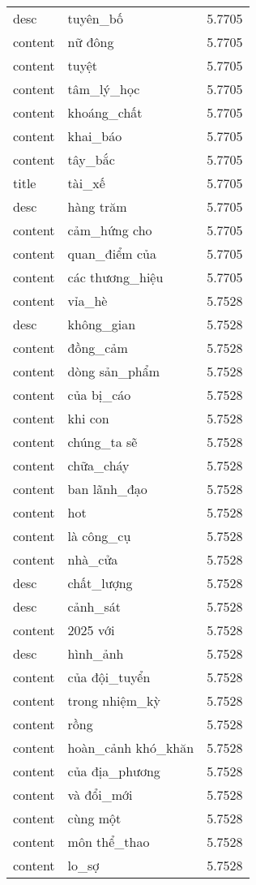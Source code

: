 \documentclass{article}
\begin{document}
\begin{tabular}{lll}
desc & tuyên\_bố & 5.7705\\
content & nữ đông & 5.7705\\
content & tuyệt & 5.7705\\
content & tâm\_lý\_học & 5.7705\\
content & khoáng\_chất & 5.7705\\
content & khai\_báo & 5.7705\\
content & tây\_bắc & 5.7705\\
title & tài\_xế & 5.7705\\
desc & hàng trăm & 5.7705\\
content & cảm\_hứng cho & 5.7705\\
content & quan\_điểm của & 5.7705\\
content & các thương\_hiệu & 5.7705\\
content & vỉa\_hè & 5.7528\\
desc & không\_gian & 5.7528\\
content & đồng\_cảm & 5.7528\\
content & dòng sản\_phẩm & 5.7528\\
content & của bị\_cáo & 5.7528\\
content & khi con & 5.7528\\
content & chúng\_ta sẽ & 5.7528\\
content & chữa\_cháy & 5.7528\\
content & ban lãnh\_đạo & 5.7528\\
content & hot & 5.7528\\
content & là công\_cụ & 5.7528\\
content & nhà\_cửa & 5.7528\\
desc & chất\_lượng & 5.7528\\
desc & cảnh\_sát & 5.7528\\
content & 2025 với & 5.7528\\
desc & hình\_ảnh & 5.7528\\
content & của đội\_tuyển & 5.7528\\
content & trong nhiệm\_kỳ & 5.7528\\
content & rồng & 5.7528\\
content & hoàn\_cảnh khó\_khăn & 5.7528\\
content & của địa\_phương & 5.7528\\
content & và đổi\_mới & 5.7528\\
content & cùng một & 5.7528\\
content & môn thể\_thao & 5.7528\\
content & lo\_sợ & 5.7528\\

\end{tabular}
\end{document}
